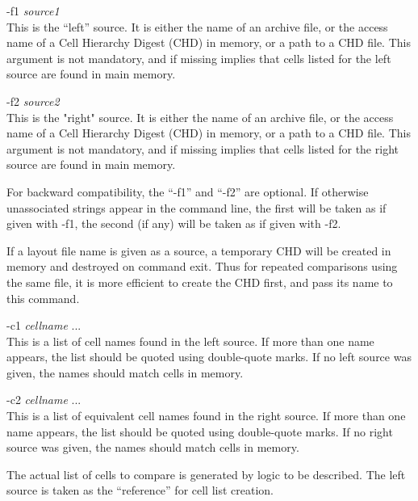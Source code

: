 \begin{description}
\item{{\vt -f1} {\it source1\/}}\\
This is the ``left'' source.  It is either the name of an archive
file, or the access name of a Cell Hierarchy Digest (CHD) in memory,
or a path to a CHD file.  This argument is not mandatory, and if
missing implies that cells listed for the left source are found in
main memory.

\item{{\vt -f2} {\it source2\/}}\\
This is the "right" source.  It is either the name of an archive file,
or the access name of a Cell Hierarchy Digest (CHD) in memory, or a
path to a CHD file.  This argument is not mandatory, and if missing
implies that cells listed for the right source are found in main
memory.
\end{description}

For backward compatibility, the ``{\vt -f1}'' and ``{\vt -f2}'' are
optional.  If otherwise unassociated strings appear in the command
line, the first will be taken as if given with {\vt -f1}, the second
(if any) will be taken as if given with {\vt -f2}.

If a layout file name is given as a source, a temporary CHD will be
created in memory and destroyed on command exit.  Thus for repeated
comparisons using the same file, it is more efficient to create the
CHD first, and pass its name to this command.

\begin{description}
\item{{\vt -c1} {\it cellname\/} ...}\\
This is a list of cell names found in the left source.  If more than
one name appears, the list should be quoted using double-quote marks. 
If no left source was given, the names should match cells in memory.

\item{{\vt -c2} {\it cellname\/} ...}\\
This is a list of equivalent cell names found in the right source.  If
more than one name appears, the list should be quoted using
double-quote marks.  If no right source was given, the names should
match cells in memory.
\end{description}

The actual list of cells to compare is generated by logic to be
described.  The left source is taken as the ``reference'' for cell
list creation.


